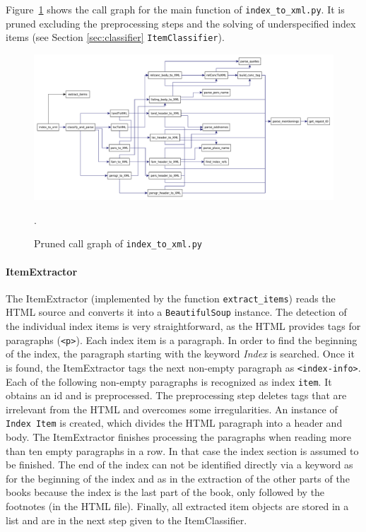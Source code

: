 Figure~\ref{fig:index-to-xml} shows the call graph for the main function of \texttt{index\_to\_xml.py}. It is pruned excluding the preprocessing steps and the solving of underspecified index items (see Section \ref{sec:classifier} \texttt{ItemClassifier}).

\begin{figure}[h]
  \centering
  \includegraphics[scale=0.37]{img/index-to-xml}
  \caption{Pruned call graph of \texttt{index\_to\_xml.py}}.
  \label{fig:index-to-xml}
\end{figure}

\paragraph{ItemExtractor}
The ItemExtractor (implemented by the function \texttt{extract\_items}) reads the HTML source and converts it into a \texttt{BeautifulSoup} instance. The detection of the individual index items is very straightforward, as the HTML provides tags for paragraphs (\texttt{<p>}). Each index item is a paragraph. In order to find the beginning of the index, the paragraph starting with the keyword \textit{Index} is searched. Once it is found, the ItemExtractor tags the next non-empty paragraph as \texttt{<index-info>}. Each of the following non-empty paragraphs is recognized as index \texttt{item}. It obtains an id and is preprocessed. The preprocessing step deletes tags that are irrelevant from the HTML and overcomes some irregularities. An instance of \texttt{Index Item} is created, which divides the HTML paragraph into a header and body. The ItemExtractor finishes processing the paragraphs when reading more than ten empty paragraphs in a row. In that case the index section is assumed to be finished. The end of the index can not be identified directly via a keyword as for the beginning of the index and as in the extraction of the other parts of the books because the index is the last part of the book, only followed by the footnotes (in the HTML file). Finally, all extracted item objects are stored in a list and are in the next step given to the ItemClassifier.

